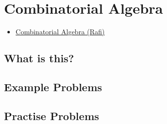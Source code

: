 \chapter{Combinatorial Algebra}%

\begin{linkb}
   \begin{itemize}
        \item \href{https://www.youtube.com/watch?v=jFvk-na3WC0}{Combinatorial Algebra (Rafi)}
   \end{itemize}
\end{linkb}

\section{What is this?}


\section{Example Problems}


\section{Practise Problems}
